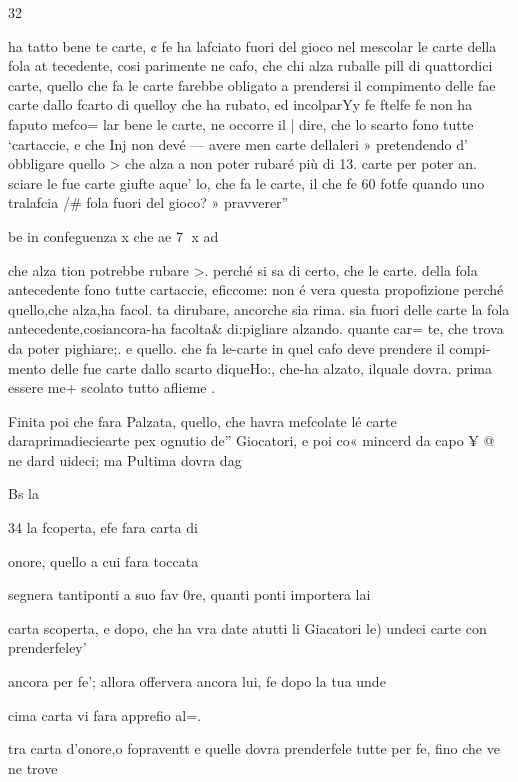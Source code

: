 \documentclass[12pt,a6paper]{article}
\begin{document}
 

 

 

 

32

ha tatto bene te carte, ¢ fe ha
lafciato fuori del gioco nel mescolar le carte della fola at
tecedente, cosi parimente ne
cafo, che chi alza ruballe pill di
quattordici carte, quello che fa
le carte farebbe obligato a
prendersi il compimento delle
fae carte dallo fcarto di quelloy che ha rubato, ed incolparYy
fe ftelfe fe non ha faputo mefco=
lar bene le carte, ne occorre il |
dire, che lo scarto fono tutte
‘cartaccie, e che Inj non devé —
avere men carte dellaleri » pretendendo d’ obbligare quello >
che alza a non poter rubaré
più di 13. carte per poter an.
sciare le fue carte giufte aque’
lo, che fa le carte, il che fe 60%
fotfe quando uno tralafcia /#
fola fuori del gioco? » pravverer”

be in confeguenza x che ae 7
x ad

che alza tion potrebbe rubare >.
perché si sa di certo, che le
carte. della fola antecedente
fono tutte cartaccie, eficcome:
non é vera questa propofizione
perché quello,che alza,ha facol.
ta dirubare, ancorche sia rima.
sia fuori delle carte la fola antecedente,cosiancora-ha facolta&
di:pigliare alzando. quante car=
te, che trova da poter pighiare;.
e quello. che fa le-carte in quel
cafo deve prendere il compi-mento delle fue carte dallo scarto diqueHo:, che-ha alzato, ilquale dovra. prima essere me+
scolato tutto aflieme .

Finita poi che fara Palzata,
quello, che havra mefcolate lé
carte daraprimadieciearte pex
ognutio de” Giocatori, e poi co«
mincerd da capo ¥ @ ne dard
uideci; ma Pultima dovra dag

Bs la

 
 

34
la fcoperta, efe fara carta di

onore, quello a cui fara toccata

segnera tantiponti a suo fav 0re, quanti ponti importera lai

carta scoperta, e dopo, che ha
vra date atutti li Giacatori le)
undeci carte con prenderfeley’

ancora per fe’; allora offervera
ancora lui, fe dopo la tua unde

cima carta vi fara apprefio al=.

tra carta d’onore,o fopraventt
e quelle dovra prenderfele tutte per fe, fino che ve ne trove
\end{document}
